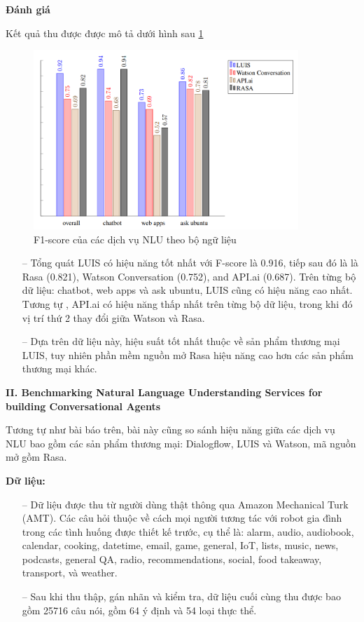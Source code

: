 \textbf{Đánh giá}

Kết quả thu được được mô tả dưới hình sau \ref{fig:comparisonimg-FscoresNLUServices}

\begin{figure}[htp]
    \centering
    \includegraphics[width=10cm]{images/comparisonimg/FscoresNLUServices.png}
    \caption{F1-score của các dịch vụ NLU theo bộ ngữ liệu}
    \label{fig:comparisonimg-FscoresNLUServices}
\end{figure}

\begin{itemize}
    \item[--] Tổng quát LUIS có hiệu năng tốt nhất với F-score là 0.916, tiếp sau đó là là Rasa (0.821), Watson Conversation (0.752), and API.ai (0.687). Trên từng bộ dữ liệu: chatbot, web apps và ask ubuntu, LUIS cũng có hiệu năng cao nhất. Tương tự , API.ai có hiệu năng thấp nhất trên từng bộ dữ liệu, trong khi đó vị trí thứ 2 thay đổi giữa Watson và Rasa.
    \item[--] Dựa trên dữ liệu này, hiệu suất tốt nhất thuộc về sản phẩm thương mại LUIS, tuy nhiên phần mềm nguồn mở Rasa hiệu năng cao hơn các sản phẩm thương mại khác.
\end{itemize}

\textbf{II. Benchmarking Natural Language Understanding Services for building Conversational Agents}

Tương tự như bài báo trên, bài này cũng so sánh hiệu năng giữa các dịch vụ NLU bao gồm các sản phẩm thương mại: Dialogflow, LUIS và Watson, mã nguồn mở gồm Rasa.

\textbf{Dữ liệu: }

\begin{itemize}
    \item[--] Dữ liệu được thu từ người dùng thật thông qua Amazon Mechanical Turk (AMT). Các câu hỏi thuộc về cách mọi người tương tác với robot gia đình trong các tình huống được thiết kế trước, cụ thể là: alarm, audio, audiobook, calendar, cooking, datetime, email, game, general, IoT, lists, music, news, podcasts, general QA, radio, recommendations, social, food takeaway, transport, và weather.
    \item[--] Sau khi thu thập, gán nhãn và kiểm tra, dữ liệu cuối cùng thu được bao gồm 25716 câu nói, gồm 64 ý định và 54 loại thực thể.
\end{itemize}

